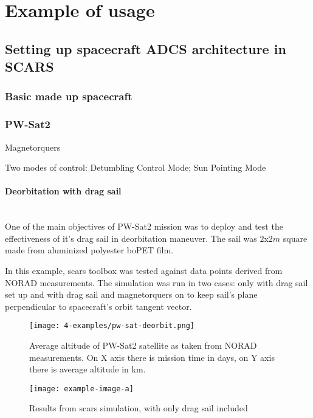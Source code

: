 \section{Example of usage}\label{sec:examples}

\subsection{Setting up spacecraft ADCS architecture in SCARS}

\subsubsection{Basic made up spacecraft}

\subsubsection{PW-Sat2}
    Magnetorquers

    Two modes of control: Detumbling Control Mode; Sun Pointing Mode

    \paragraph*{Deorbitation with drag sail}\hspace{0pt} \\
        One of the main objectives of PW-Sat2 mission was to deploy and test the effectiveness of it's drag sail in deorbitation maneuver. The sail was  $2$x$2m$ square made from aluminized polyester boPET film.\cite{pwsat2dt}
        
        In this example, \ac{scars} toolbox was tested against data points derived from NORAD measurements. The simulation was run in two cases: only with drag sail set up and with drag sail and magnetorquers on to keep sail's plane perpendicular to spacecraft's orbit tangent vector.
         
        \begin{figure}[H]
            \centering
            \texttt{[image: 4-examples/pw-sat-deorbit.png]}
            \caption{Average altitude of PW-Sat2 satellite as taken from NORAD measurements. On X axis there is mission time in days, on Y axis there is average altitude in km.}
            \label{fig:pw-sat-deorbit}
        \end{figure}
         
        \begin{figure}[H]
            \centering
            \texttt{[image: example-image-a]}
            \caption{Results from \ac{scars} simulation, with only drag sail included}
            \label{fig:scars-deorbit}
        \end{figure}
         
